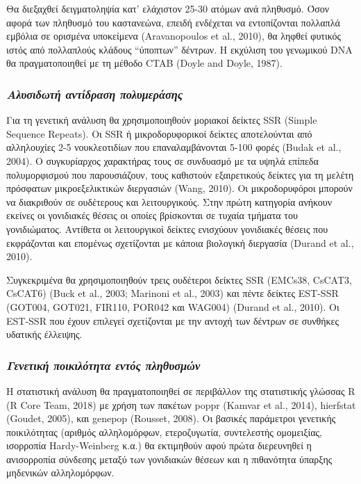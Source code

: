 \documentclass[12pt,a4paper,]{report}
\begin{document}
Θα διεξαχθεί δειγματοληψία κατ' ελάχιστον 25-30 ατόμων ανά πληθυσμό.
Όσον αφορά των πληθυσμό του καστανεώνα, επειδή ενδέχεται να εντοπίζονται
πολλαπλά εμβόλια σε ορισμένα υποκείμενα (Aravanopoulos et al., 2010), θα
ληφθεί φυτικός ιστός από πολλαπλούς κλάδους ``ύποπτων'' δέντρων. Η
εκχύλιση του γενωμικού DNA θα πραγματοποιηθεί με τη μέθοδο CTAB (Doyle
and Doyle, 1987).

\hypertarget{--}{%
\subsubsection{\texorpdfstring{\emph{Αλυσιδωτή αντίδραση
πολυμεράσης}}{Αλυσιδωτή αντίδραση πολυμεράσης}}\label{--}}

Για τη γενετική ανάλυση θα χρησιμοποιηθούν μοριακοί δείκτες SSR (Simple
Sequence Repeats). Οι SSR ή μικροδορυφορικοί δείκτες αποτελούνται από
αλληλουχίες 2-5 νουκλεοτιδίων που επαναλαμβάνονται 5-100 φορές (Budak et
al., 2004). Ο συγκυρίαρχος χαρακτήρας τους σε συνδυασμό με τα υψηλά
επίπεδα πολυμορφισμού που παρουσιάζουν, τους καθιστούν εξαιρετικούς
δείκτες για τη μελέτη πρόσφατων μικροεξελικτικών διεργασιών (Wang,
2010). Οι μικροδορυφόροι μπορούν να διακριθούν σε ουδέτερους και
λειτουργικούς. Στην πρώτη κατηγορία ανήκουν εκείνες οι γονιδιακές θέσεις
οι οποίες βρίσκονται σε τυχαία τμήματα του γονιδιώματος. Αντίθετα οι
λειτουργικοί δείκτες ενισχύουν γονιδιακές θέσεις που εκφράζονται και
επομένως σχετίζονται με κάποια βιολογική διεργασία (Durand et al.,
2010).

Συγκεκριμένα θα χρησιμοποιηθούν τρεις ουδέτεροι δείκτες SSR (EMCs38,
CsCAT3, CsCAT6) (Buck et al., 2003; Marinoni et al., 2003) και πέντε
δείκτες EST-SSR (GOT004, GOT021, FIR110, POR042 και WAG004) (Durand et
al., 2010). Οι EST-SSR που έχουν επιλεγεί σχετίζονται με την αντοχή των
δέντρων σε συνθήκες υδατικής έλλειψης.

\hypertarget{---}{%
\subsubsection{\texorpdfstring{\emph{Γενετική ποικιλότητα εντός
πληθυσμών}}{Γενετική ποικιλότητα εντός πληθυσμών}}\label{---}}

Η στατιστική ανάλυση θα πραγματοποιηθεί σε περιβάλλον της στατιστικής
γλώσσας R (R Core Team, 2018) με χρήση των πακέτων poppr (Kamvar et al.,
2014), hierfstat (Goudet, 2005), και genepop (Rousset, 2008). Οι βασικές
παράμετροι γενετικής ποικιλότητας (αριθμός αλληλομόρφων, ετεροζυγωτία,
συντελεστής ομομειξίας, ισορροπία Hardy-Weinberg κ.α.) θα εκτιμηθούν
αφού πρώτα διερευνηθεί η ανισορροπία σύνδεσης μεταξύ των γονιδιακών
θέσεων και η πιθανότητα ύπαρξης μηδενικών αλληλομόρφων.
\end{document}
